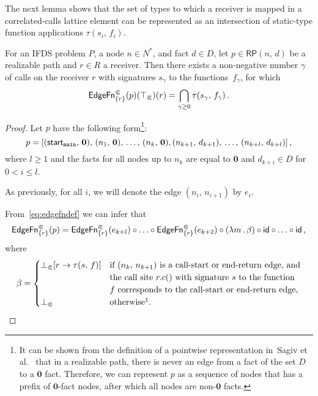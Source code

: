 The next lemma shows that the set of types to which a receiver is mapped in a correlated-calls lattice element can be represented as an intersection of static-type function applications $\tau(s_i,\,f_i)$.
\begin{lemma}\label{lem:edgefnThroughTaus}
  For an IFDS problem $P$, a node $n\in N^*$, and fact $d\in D$, let $p\in\mathsf{RP}(n,\,d)$ be a realizable path and $r\in R$ a receiver. Then there exists a non-negative number $\gamma$ of calls on the receiver $r$ with signatures $s_\gamma$ to the functions~$f_\gamma$, for which
  \[
    \textsf{EdgeFn}^\Subset_{\{r\}}(p)(\top_\Subset)(r)=
      \bigcap_{\gamma\ge0}\tau(s_\gamma,\,f_\gamma)\,.
  \]
\end{lemma}
\begin{proof}
  Let $p$ have the following form\footnote{It can be shown from the definition of a pointwise representation in~Sagiv et al.~\cite{sagiv1996precise} that in a realizable path, there is never an edge from a fact of the set $D$ to a $\mathbf0$ fact. Therefore, we can represent $p$ as a sequence of nodes that has a prefix of $\mathbf0$-fact nodes, after which all nodes are non-$\mathbf0$ facts.}:
  \[
    p=[(\textsf{start}_\texttt{main},\,\mathbf0),\,(n_1,\,\mathbf0),\,\dots,\,(n_k,\,\mathbf0),
       (n_{k+1},\,d_{k+1}),\,\dots,\,(n_{k+l},\,d_{k+l})]\,,
  \]
  where $l\ge1$ and the facts for all nodes up to $n_k$ are equal to $\mathbf0$ and $d_{k+i}\in D$ for $0<i\le l$.
  
  As previously, for all $i$, we will denote the edge $(n_i,\,n_{i+1})$ by $e_i$.  
  
  From~\eqref{eq:edgefndef} we can infer that
  \[
    \textsf{EdgeFn}^\Subset_{\{r\}}(p)=
    \textsf{EdgeFn}^\Subset_{\{r\}}(e_{k+l})
    \circ\ldots
    \circ\textsf{EdgeFn}^\Subset_{\{r\}}(e_{k+2})
    \circ(\lambda m\,.\,\beta)
    \circ\textsf{id}
    \circ\ldots
    \circ\textsf{id}\,,
  \]
  where
  \[
    \beta=
    \begin{cases}
      \botcc[r\to\tau(s,\,f)]&\text{if $(n_k,\,n_{k+1})$ is a call-start or end-return edge, and}\\&\text{the call site $r.c()$ with signature $s$ to the function}\\
      &\text{$f$ corresponds to the call-start or end-return edge,}\\
      \botcc&\text{otherwise\footnotemark.}
    \end{cases}
  \]
  

\end{proof}

